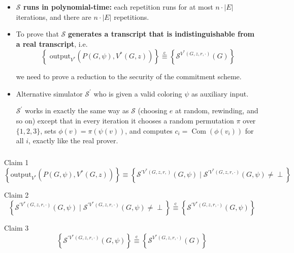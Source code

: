 \documentclass{beamer}
\begin{document}
    \begin{frame}
        \frametitle{}
        \begin{itemize}
            \item \textbf{$\mathcal{S}$ runs in polynomial-time: } each repetition runs for at most $n \cdot|E|$ iterations, and there are $n \cdot|E|$ repetitions.
            \item To prove that $\mathcal{S}$ \textbf{generates a transcript that is indistinguishable from a real transcript}, i.e.
            $$
            \left\{\text { output}_{V^{*}}\left(P(G, \psi), V^{*}(G, z)\right)\right\} \stackrel{\mathrm{c}}{\equiv}\left\{\mathcal{S}^{V^{*}(G, z, r, \cdot)}(G)\right\}
            $$
            
            we need to prove a reduction to the security of the commitment scheme. 
            \item Alternative simulator $\mathcal{S}^{\prime}$ who is given a valid coloring $\psi$ as auxiliary input. 

            $\mathcal{S}^{\prime}$ works in exactly the same way as $\mathcal{S}$ (choosing $e$ at random, rewinding, and so on) except that in every iteration it chooses a random permutation $\pi$ over $\{1,2,3\}$, sets $\phi(v)=\pi(\psi(v))$, and computes $c_{i}=\operatorname{Com}\left(\phi\left(v_{i}\right)\right)$ for all $i$, exactly like the real prover.
        \end{itemize}
    
        
    
    \end{frame}
    \begin{frame}
        \frametitle{}
        \begin{block}{Claim 1}
            $$
            \left\{\text {output}_{V^{*}}\left(P(G, \psi), V^{*}(G, z)\right)\right\} \equiv\left\{{\mathcal{S}}^{\prime V^{*}(G, z, r,)}(G, \psi) \mid \mathcal{S}^{\prime V^{*}(G, z, r, \cdot)}(G, \psi) \neq \perp\right\}
            $$
        \end{block}

        \begin{block}{Claim 2}
            $$
            \left\{\mathcal{S}^{\prime V^{*}(G, z, r, \cdot)}(G, \psi) \mid \mathcal{S}^{\prime V^{*}(G, z, r, \cdot)}(G, \psi) \neq \perp\right\} \stackrel{\mathrm{c}}{\equiv}\left\{\mathcal{S}^{\prime V^{*}(G, z, r, \cdot)}(G, \psi)\right\}
            $$
            
        \end{block}

        \begin{block}{Claim 3}
            $$
            \left\{\mathcal{S}^{\prime V^{*}(G, z, r, \cdot)}(G, \psi)\right\} \stackrel{\mathrm{c}}{\equiv}\left\{\mathcal{S}^{V^{*}(G, z, r, \cdot)}(G)\right\}
            $$
            
        \end{block}

    
        
    
    \end{frame}
\end{document}
